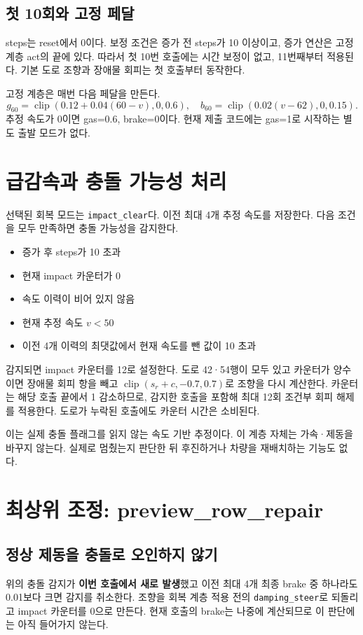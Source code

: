 \documentclass[11pt,a4paper]{article}
\newcommand{\code}[1]{{\small\nolinkurl{#1}}}
\newcommand{\clip}{\operatorname{clip}}
\begin{document}
\subsection{첫 10회와 고정 페달}
steps는 reset에서 0이다. 보정 조건은 증가 전 steps가 10 이상이고, 증가 연산은 고정 계층 act의 끝에 있다. 따라서 첫 10번 호출에는 시간 보정이 없고, 11번째부터 적용된다. 기본 도로 조향과 장애물 회피는 첫 호출부터 동작한다.

고정 계층은 매번 다음 페달을 만든다.
\[
 g_{60}=\clip(0.12+0.04(60-v),0,0.6),\quad
 b_{60}=\clip(0.02(v-62),0,0.15).
\]
추정 속도가 0이면 gas=0.6, brake=0이다. 현재 제출 코드에는 gas=1로 시작하는 별도 출발 모드가 없다.

\section{급감속과 충돌 가능성 처리}
선택된 회복 모드는 \code{impact_clear}다. 이전 최대 4개 추정 속도를 저장한다. 다음 조건을 모두 만족하면 충돌 가능성을 감지한다.
\begin{itemize}
\item 증가 후 steps가 10 초과
\item 현재 impact 카운터가 0
\item 속도 이력이 비어 있지 않음
\item 현재 추정 속도 $v<50$
\item 이전 4개 이력의 최댓값에서 현재 속도를 뺀 값이 10 초과
\end{itemize}
감지되면 impact 카운터를 12로 설정한다. 도로 42·54행이 모두 있고 카운터가 양수이면 장애물 회피 항을 빼고 $\clip(s_r+c,-0.7,0.7)$로 조향을 다시 계산한다. 카운터는 해당 호출 끝에서 1 감소하므로, 감지한 호출을 포함해 최대 12회 조건부 회피 해제를 적용한다. 도로가 누락된 호출에도 카운터 시간은 소비된다.

이는 실제 충돌 플래그를 읽지 않는 속도 기반 추정이다. 이 계층 자체는 가속·제동을 바꾸지 않는다. 실제로 멈췄는지 판단한 뒤 후진하거나 차량을 재배치하는 기능도 없다.

\section{최상위 조정: preview\_row\_repair}
\subsection{정상 제동을 충돌로 오인하지 않기}
위의 충돌 감지가 \textbf{이번 호출에서 새로 발생}했고 이전 최대 4개 최종 brake 중 하나라도 0.01보다 크면 감지를 취소한다. 조향을 회복 계층 적용 전의 \code{damping_steer}로 되돌리고 impact 카운터를 0으로 만든다. 현재 호출의 brake는 나중에 계산되므로 이 판단에는 아직 들어가지 않는다.
\end{document}
